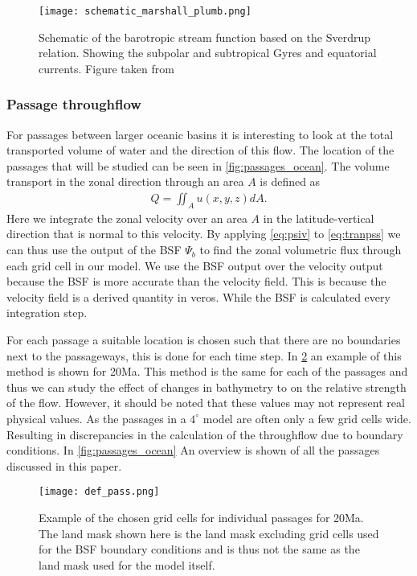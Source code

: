 \begin{multicols}{2}
  \begin{figure}[H]
 	\texttt{[image: schematic\_marshall\_plumb.png]}
 	\caption{Schematic of the barotropic stream function based on the Sverdrup relation. Showing the subpolar and subtropical Gyres and equatorial currents. Figure taken from \cite{MarschallPlumb}}
 	\label{fig:schem_currents}
 \end{figure}
\newpage
\subsubsection{Passage throughflow}\label{sec:throughflowp}
For passages between larger oceanic basins it is interesting to look at the total transported volume of water and the direction of this flow. The location of the passages that will be studied can be seen in \cref{fig:passages_ocean}. The volume transport in the zonal direction through an area $A$ is defined as
\begin{align}
Q = \iint_A u(x,y,z) dA. \label{eq:tranpss}
\end{align}	
Here we integrate the zonal velocity over an area $A$ in the latitude-vertical direction that is normal to this velocity. By applying \cref{eq:psiv} to \cref{eq:tranpss} we can thus use the output of the BSF $\Psi_b$ to find the zonal volumetric flux through each grid cell in our model. We use the BSF output over the velocity output because the BSF is more accurate than the velocity field. This is because the velocity field is a derived quantity in veros. While the BSF is calculated every integration step.

For each passage a suitable location is chosen such that there are no boundaries next to the passageways, this is done for each time step. In \cref{fig:passages_def} an example of this method is shown for 20Ma. This method is the same for each of the passages and thus we can study the effect of changes in bathymetry to on the relative strength of the flow. However, it should be noted that these values may not represent real physical values. As the passages in a $4^{\circ}$ model are often only a few grid cells wide. Resulting in discrepancies in the calculation of the throughflow due to boundary conditions. In \cref{fig:passages_ocean} An overview is shown of all the passages discussed in this paper.


\begin{figure}[H]
	\texttt{[image: def\_pass.png]}
	\caption{Example of the chosen grid cells for individual passages for 20Ma. The land mask shown here is the land mask excluding grid cells used for the BSF boundary conditions and is thus not the same as the land mask used for the model itself.}
	\label{fig:passages_def}
\end{figure}

\end{multicols}
